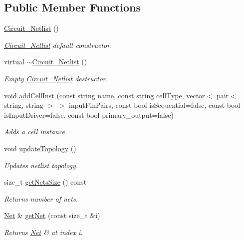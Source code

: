 \subsection*{Public Member Functions}
\begin{DoxyCompactItemize}
\item 
\hyperlink{classCircuit__Netlist_aae9b9e9ea0db3af35377d67a6e4d3d98}{Circuit\-\_\-\-Netlist} ()
\begin{DoxyCompactList}\small\item\em \hyperlink{classCircuit__Netlist}{Circuit\-\_\-\-Netlist} default constructor. \end{DoxyCompactList}\item 
virtual \hyperlink{classCircuit__Netlist_a976bdf13baf79ba608b0c2eff6682efc}{$\sim$\-Circuit\-\_\-\-Netlist} ()
\begin{DoxyCompactList}\small\item\em Empty \hyperlink{classCircuit__Netlist}{Circuit\-\_\-\-Netlist} destructor. \end{DoxyCompactList}\item 
void \hyperlink{classCircuit__Netlist_a325723d10f874b1f37fae290929bb05e}{add\-Cell\-Inst} (const string name, const string cell\-Type, vector$<$ pair$<$ string, string $>$ $>$ input\-Pin\-Pairs, const bool is\-Sequential=false, const bool is\-Input\-Driver=false, const bool primary\-\_\-output=false)
\begin{DoxyCompactList}\small\item\em Adds a cell instance. \end{DoxyCompactList}\item 
void \hyperlink{classCircuit__Netlist_ac5ab8d692eb5d18bed59e41d2c55b678}{update\-Topology} ()
\begin{DoxyCompactList}\small\item\em Updates netlist topology. \end{DoxyCompactList}\item 
size\-\_\-t \hyperlink{classCircuit__Netlist_a9bcee2cb05504ee65f3e70df9f89f576}{get\-Nets\-Size} () const 
\begin{DoxyCompactList}\small\item\em Returns number of nets. \end{DoxyCompactList}\item 
\hyperlink{structCircuit__Netlist_1_1Net}{Net} \& \hyperlink{classCircuit__Netlist_ad894dfb5dabad7c657c450d32adda23d}{get\-Net} (const size\-\_\-t \&i)
\begin{DoxyCompactList}\small\item\em Returns \hyperlink{structCircuit__Netlist_1_1Net}{Net} \& at index i. \end{DoxyCompactList}\item 

\end{DoxyCompactItemize}
